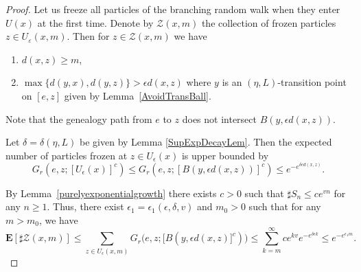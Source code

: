 \documentclass{amsart}
\newcommand{\showcomments}{yes}
\newenvironment{comment}%
{\ifthenelse{\equal{\showcomments}{yes}}%
{\footnotemark
    \begin{lrbox}{\commentbox}
    \begin{minipage}[t]{1.25in}\raggedright\sffamily\upshape\tiny
    \footnotemark[\arabic{footnote}]}%
{\begin{lrbox}{\commentbox}}}%
{\ifthenelse{\equal{\showcomments}{yes}}%
{\end{minipage}\end{lrbox}\marginpar{\usebox{\commentbox}}}%
{\end{lrbox}}}
\theoremstyle{definition}
\theoremstyle{remark}
\newcommand{\ywy}[1]{{\color{red}{#1}}}
\begin{document}
\begin{proof}
Let us freeze all particles of the branching random walk %
when they enter $U(x)$ at the first time.  Denote by $\mathcal{Z}(x, m)$ the collection of frozen particles $z \in U_{\varepsilon}(x, m)$.  Then for $z \in \mathcal{Z}(x, m)$ we have 
\begin{enumerate}
    \item 
     $d(x,z)\ge m$,  
    \item 
     $\max\{d(y,x), d(y,z)\}>\epsilon d(x,z)$ where $y$ is an $(\eta,L)$-transition point on $[e,z]$ given by Lemma~\ref{AvoidTransBall}.  
\end{enumerate}    
Note that  the genealogy path from $e$ to $z$ does not intersect $B(y,\epsilon d(x,z))$.  

Let $\delta=\delta(\eta, L)$ be given by Lemma \ref{SupExpDecayLem}. Then     the expected number of  particles frozen%
at $z\in U_\epsilon(x)$   is upper bounded by
$$
G_{r}(e,z; [U_\epsilon(x)]^c) \le G_{r}(e,z; [B(y,\epsilon d(x,z))]^c) \le e^{-   e^{\delta \epsilon d(x,z)}}. 
$$  

By Lemma~\ref{purelyexponentialgrowth} there exists $c>0$ such that $\sharp S_n\le c e^{vn}$ for any $n\ge 1$. Thus,  there exist $\epsilon_1=\epsilon_1(\epsilon,\delta,v)$ and $m_0>0$ such that for any $m>m_0$, we have
$$
\mathbf E[\sharp \mathcal Z({x,m})]\le \sum_{z\in U_\epsilon(x,m)} G_{r}\bigl (e,z; [B(y,\epsilon d(x,z)]^c)\bigr) \le \sum_{k=m}^{\infty} ce^{kv} e^{-   e^{\delta\epsilon k}} \le e^{-e^{\epsilon_1 m}}.
$$
 

\end{proof}
\end{document}
